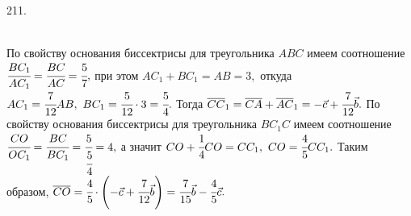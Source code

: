 211. \begin{figure}[ht!]
\end{figure}\\
По свойству основания биссектрисы для треугольника $ABC$ имеем соотношение
$\cfrac{BC_1}{AC_1}=\cfrac{BC}{AC}=\cfrac{5}{7},$ при этом $AC_1+BC_1=AB=3,$ откуда $AC_1=\cfrac{7}{12}AB,\ BC_1=\cfrac{5}{12}\cdot3=\cfrac{5}{4}.$ Тогда $\overline{CC}_1=\overline{CA}+\overline{AC}_1=-\vec{c}+\cfrac{7}{12}\vec{b}.$
По свойству основания биссектрисы для треугольника $BC_1C$ имеем соотношение
$\cfrac{CO}{OC_1}=\cfrac{BC}{BC_1}=\cfrac{5}{\cfrac{5}{4}}=4,$ а значит $CO+\cfrac{1}{4}CO=CC_1,\ CO=\cfrac{4}{5}CC_1.$ Таким образом, $\overline{CO}=\cfrac{4}{5}\cdot\left(-\vec{c}+\cfrac{7}{12}\vec{b}\right)=
\cfrac{7}{15}\vec{b}-\cfrac{4}{5}\vec{c}.$\newpage\noindent
